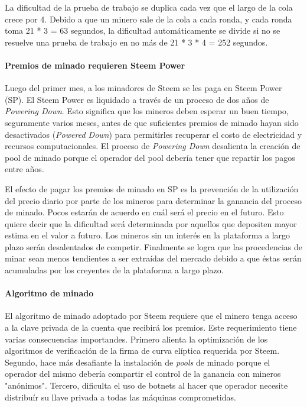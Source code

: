 \documentclass[a4paper,titlepage,final]{article}
\begin{document}
La dificultad de la prueba de trabajo se duplica cada vez que el largo de la cola crece por 4. Debido a que un minero sale de la cola a cada ronda, y cada ronda toma 21 * 3 = 63 segundos, la dificultad automáticamente se divide si no se resuelve una prueba de trabajo en no más de 21 * 3 * 4 = 252 segundos.

\paragraph{Premios de minado requieren Steem Power}

Luego del primer mes, a los minadores de Steem se les paga en Steem Power (SP). El Steem Power es liquidado a través de un proceso de dos años de \textit{Powering Down}. Esto significa que los mineros deben esperar un buen tiempo, seguramente varios meses, antes de que suficientes premios de minado hayan sido desactivados (\textit{Powered Down}) para permitirles recuperar el costo de electricidad y recursos computacionales. El proceso de \textit{Powering Down} desalienta la creación de pool de minado porque el operador del pool debería tener que repartir los pagos entre años.

El efecto de pagar los premios de minado en SP es la prevención de la utilización del precio diario por parte de los mineros para determinar la ganancia del proceso de minado. Pocos estarán de acuerdo en cuál será el precio en el futuro. Esto quiere decir que la dificultad será determinada por aquellos que depositen mayor estima en el valor a futuro. Los mineros sin un interés en la plataforma a largo plazo serán desalentados de competir. Finalmente se logra que las procedencias de minar sean menos tendientes a ser extraídas del mercado debido a que éstas serán acumuladas por los creyentes de la plataforma a largo plazo.

\paragraph{Algoritmo de minado}

El algoritmo de minado adoptado por Steem requiere que el minero tenga acceso a la clave privada de la cuenta que recibirá los premios. Este requerimiento tiene varias consecuencias importandes. Primero alienta la optimización de los algoritmos de verificación de la firma de curva elíptica requerida por Steem. Segundo, hace más desafiante la instalación de \textit{pools} de minado porque el operador del mismo debería compartir el control de la ganancia con mineros "anónimos". Tercero, dificulta el uso de botnets al hacer que operador necesite distribuír su llave privada a todas las máquinas comprometidas.
\end{document}
